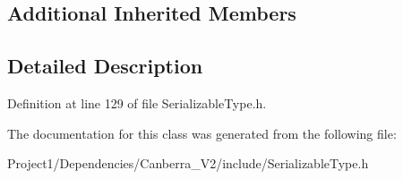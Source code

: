 \subsection*{Additional Inherited Members}


\subsection{Detailed Description}


Definition at line 129 of file Serializable\+Type.\+h.



The documentation for this class was generated from the following file\+:\begin{DoxyCompactItemize}
\item 
Project1/\+Dependencies/\+Canberra\+\_\+\+V2/include/Serializable\+Type.\+h\end{DoxyCompactItemize}
